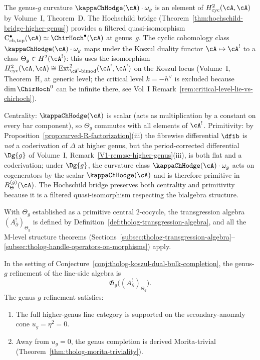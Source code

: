 \begin{remark}
The genus-\(g\) curvature \(\kappaChHodge(\cA) \cdot \omega_g\) is an
element of \(H^2_{\mathrm{cyc}}(\cA, \cA)\) by Volume~I,
Theorem~D. The Hochschild bridge
(Theorem~\ref{thm:hochschild-bridge-higher-genus}) provides a
filtered quasi-isomorphism
\(\mathrm{C}^\bullet_{\mathrm{ch,top}}(\cA) \simeq
\ChirHoch^\bullet(\cA)\) at genus~\(g\). The cyclic cohomology
class \(\kappaChHodge(\cA) \cdot \omega_g\) maps under the Koszul
duality functor \(\cA \mapsto \cA^!\) to a class
\(\Theta_g \in H^2(\cA^!)\): this uses the isomorphism
\(H^2_{\mathrm{cyc}}(\cA, \cA) \cong
\mathrm{Ext}^2_{\cA^!\text{-}\mathrm{bimod}}(\cA^!, \cA^!)\)
on the Koszul locus (Volume~I, Theorem~H, at generic level; the critical
level $k = -h^\vee$ is excluded because $\dim \ChirHoch^0$ can be infinite
there, see Vol~I Remark~\ref*{rem:critical-level-lie-vs-chirhoch}).

Centrality: \(\kappaChHodge(\cA)\) is scalar (acts as multiplication by a
constant on every bar component), so \(\Theta_g\) commutes with
all elements of \(\cA^!\). Primitivity: by
Proposition~\ref{prop:curved-R-factorization}\textup{(iii)} the
fibrewise differential \(\dfib\) is \emph{not} a coderivation of
\(\Delta\) at higher genus, but the period-corrected
differential \(\Dg{g}\) of Volume~I,
Remark~\ref{V1-rem:sc-higher-genus}\textup{(iii)}, is both flat
and a coderivation; under \(\Dg{g}\), the curvature class
\(\kappaChHodge(\cA)\cdot\omega_g\) acts on cogenerators by the scalar
\(\kappaChHodge(\cA)\) and is therefore primitive in
\(B_\Theta^{(g)}(\cA)\). The Hochschild bridge preserves both
centrality and primitivity because it is a filtered
quasi-isomorphism respecting the bialgebra structure.

With \(\Theta_g\) established as a primitive central \(2\)-cocycle,
the transgression algebra \((A_{\partial}^{!})_{\Theta_g}\) is
defined by Definition~\ref{def:tholog-transgression-algebra}, and
all the M-level structure theorems
(Sections~\ref{subsec:tholog-transgression-algebra}--\ref{subsec:tholog-handle-operators-on-morphisms})
apply.
\end{remark}

\begin{conjecture}
In the setting of Conjecture~\ref{conj:tholog-koszul-dual-bulk-completion},
the genus-\(g\) refinement of the line-side algebra is
\[
\mathfrak{G}_{g}\!\big((A_{\partial}^{!})_{\Theta_{g}}\big).
\]
The genus-$g$ refinement satisfies:
\begin{enumerate}[label=\textup{(\roman*)}]
\item The full higher-genus line category is supported on the
 secondary-anomaly cone \(u_{g} = \eta^2 = 0\).
\item Away from \(u_g = 0\), the genus completion is derived
 Morita-trivial
 (Theorem~\textup{\ref{thm:tholog-morita-triviality}}).
\end{enumerate}
\end{conjecture}

